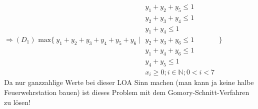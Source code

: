 \documentclass[a4paper,10pt]{article}
\begin{document}
	$ \Longrightarrow (D_1) \text{ max} \{\ y_1+y_2+y_3+y_4+y_5+y_6 \mid 
	\begin{matrix}
	y_1 + y_2 + y_5 \leq 1\\
	y_2 + y_3 + y_4 \leq 1\\
	y_1 + y_4 \leq 1\\
	y_2 + y_3 + y_6 \leq 1\\
	y_1 + y_4 + y_6 \leq 1\\
	y_4 + y_5 \leq 1 \\
	x_i \geq 0; i\in \mathbb{N}; 0<i<7
	\end{matrix}
	\ \}$\\
	
	Da nur ganzzahlige Werte bei dieser LOA Sinn machen (man kann ja keine halbe Feuerwehrstation bauen) ist dieses Problem mit dem Gomory-Schnitt-Verfahren zu lösen!
\end{document}
